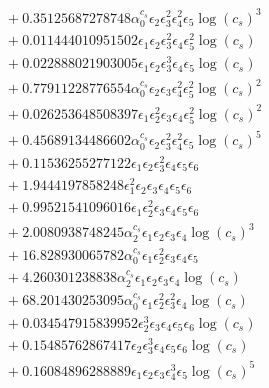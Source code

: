 \documentclass[10pt]{article}
\begin{document}
\begin{align*}
&{}  + 0.35125687278748 \alpha_{0}^{c_s} \epsilon_{2} \epsilon_{3}^{2} \epsilon_{4}^{2} \epsilon_{5} \log{\left(c_{s} \right)}^{3} \\
&{}  + 0.011444010951502 \epsilon_{1} \epsilon_{2} \epsilon_{3}^{2} \epsilon_{4} \epsilon_{5}^{2} \log{\left(c_{s} \right)} \\
&{}  + 0.022888021903005 \epsilon_{1} \epsilon_{2} \epsilon_{3}^{3} \epsilon_{4} \epsilon_{5} \log{\left(c_{s} \right)} \\
&{}  + 0.77911228776554 \alpha_{0}^{c_s} \epsilon_{2} \epsilon_{3} \epsilon_{4}^{2} \epsilon_{5}^{2} \log{\left(c_{s} \right)}^{2} \\
&{}  + 0.026253648508397 \epsilon_{1} \epsilon_{2}^{2} \epsilon_{3} \epsilon_{4} \epsilon_{5}^{2} \log{\left(c_{s} \right)}^{2} \\
&{}  + 0.45689134486602 \alpha_{0}^{c_s} \epsilon_{2} \epsilon_{3}^{2} \epsilon_{4}^{2} \epsilon_{5} \log{\left(c_{s} \right)}^{5} \\
&{}  + 0.11536255277122 \epsilon_{1} \epsilon_{2} \epsilon_{3}^{2} \epsilon_{4} \epsilon_{5} \epsilon_{6} \\
&{}  + 1.9444197858248 \epsilon_{1}^{2} \epsilon_{2} \epsilon_{3} \epsilon_{4} \epsilon_{5} \epsilon_{6} \\
&{}  + 0.99521541096016 \epsilon_{1} \epsilon_{2}^{2} \epsilon_{3} \epsilon_{4} \epsilon_{5} \epsilon_{6} \\
&{}  + 2.0080938748245 \alpha_{2}^{c_s} \epsilon_{1} \epsilon_{2} \epsilon_{3} \epsilon_{4} \log{\left(c_{s} \right)}^{3} \\
&{}  + 16.828930065782 \alpha_{0}^{c_s} \epsilon_{1} \epsilon_{2}^{2} \epsilon_{3} \epsilon_{4} \epsilon_{5} \\
&{}  + 4.260301238838 \alpha_{2}^{c_s} \epsilon_{1} \epsilon_{2} \epsilon_{3} \epsilon_{4} \log{\left(c_{s} \right)} \\
&{}  + 68.201430253095 \alpha_{0}^{c_s} \epsilon_{1} \epsilon_{2}^{2} \epsilon_{3}^{2} \epsilon_{4} \log{\left(c_{s} \right)} \\
&{}  + 0.034547915839952 \epsilon_{2}^{3} \epsilon_{3} \epsilon_{4} \epsilon_{5} \epsilon_{6} \log{\left(c_{s} \right)} \\
&{}  + 0.15485762867417 \epsilon_{2} \epsilon_{3}^{3} \epsilon_{4} \epsilon_{5} \epsilon_{6} \log{\left(c_{s} \right)} \\
&{}  + 0.16084896288889 \epsilon_{1} \epsilon_{2} \epsilon_{3} \epsilon_{4}^{3} \epsilon_{5} \log{\left(c_{s} \right)}^{5} \\

\end{align*}
\end{document}
